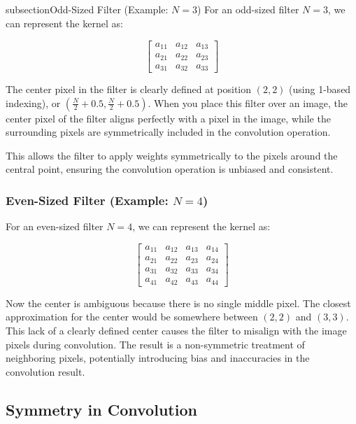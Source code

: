 \documentclass{article}
\begin{document}
\subsection{}subsection{Odd-Sized Filter (Example: $N = 3$)}
For an odd-sized filter $N = 3$, we can represent the kernel as:

\[
\begin{bmatrix}
a_{11} & a_{12} & a_{13} \\
a_{21} & a_{22} & a_{23} \\
a_{31} & a_{32} & a_{33}
\end{bmatrix}
\]

The center pixel in the filter is clearly defined at position $(2,2)$ (using 1-based indexing), or $\left( \frac{N}{2} + 0.5, \frac{N}{2} + 0.5 \right)$. When you place this filter over an image, the center pixel of the filter aligns perfectly with a pixel in the image, while the surrounding pixels are symmetrically included in the convolution operation.

This allows the filter to apply weights symmetrically to the pixels around the central point, ensuring the convolution operation is unbiased and consistent.

\subsubsection{Even-Sized Filter (Example: $N = 4$)}

For an even-sized filter $N = 4$, we can represent the kernel as:

\[
\begin{bmatrix}
a_{11} & a_{12} & a_{13} & a_{14} \\
a_{21} & a_{22} & a_{23} & a_{24} \\
a_{31} & a_{32} & a_{33} & a_{34} \\
a_{41} & a_{42} & a_{43} & a_{44}
\end{bmatrix}
\]

Now the center is ambiguous because there is no single middle pixel. The closest approximation for the center would be somewhere between $(2,2)$ and $(3,3)$. This lack of a clearly defined center causes the filter to misalign with the image pixels during convolution. The result is a non-symmetric treatment of neighboring pixels, potentially introducing bias and inaccuracies in the convolution result.

\subsection{Symmetry in Convolution}
\end{document}
